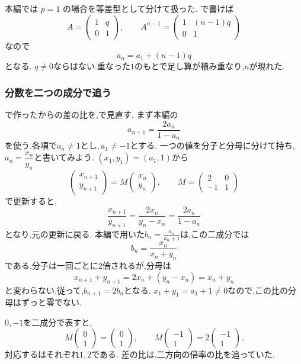 本編では $p=1$ の場合を等差型として分けて扱った.
で書けば
\[
  A=\begin{pmatrix}1&q\\0&1\end{pmatrix},
  \qquad
  A^{n-1}=\begin{pmatrix}1&(n-1)q\\0&1\end{pmatrix}
\]
なので
\[
  a_n=a_1+(n-1)q
\]
となる.
$q\ne0$ならはない.重なった$1$のもとで足し算が積み重なり,$n$が現れた.



\subsubsection{分数を二つの成分で追う}\label{節：一次分数型を行列で見直す}

で作ったからの差の比を,で見直す.
まず本編の
\[
  a_{n+1}=\frac{2a_n}{1-a_n}
\]
を使う.各項で$a_n\ne1$とし,\,$a_1\ne-1$とする.
一つの値を分子と分母に分けて持ち,$a_n=\dfrac{x_n}{y_n}$と書いてみよう.
$(x_1,y_1)=(a_1,1)$から
\[
  \begin{pmatrix}x_{n+1}\\y_{n+1}\end{pmatrix}
  =M\begin{pmatrix}x_n\\y_n\end{pmatrix},
  \qquad
  M=\begin{pmatrix}2&0\\-1&1\end{pmatrix}
\]
で更新すると,
\[
  \frac{x_{n+1}}{y_{n+1}}
  =\frac{2x_n}{y_n-x_n}
  =\frac{2a_n}{1-a_n}
\]
となり,元の更新に戻る.
本編で用いた$\displaystyle b_n=\frac{a_n}{a_n+1}$は,この二成分では
\[
  b_n=\frac{x_n}{x_n+y_n}
\]
である.分子は一回ごとに$2$倍されるが,分母は
\[
  x_{n+1}+y_{n+1}=2x_n+(y_n-x_n)=x_n+y_n
\]
と変わらない.従って,$b_{n+1}=2b_n$となる.
$x_1+y_1=a_1+1\ne0$なので,この比の分母はずっと零でない.

$0,-1$を二成分で表すと,
\[
  M\begin{pmatrix}0\\1\end{pmatrix}
  =\begin{pmatrix}0\\1\end{pmatrix},
  \qquad
  M\begin{pmatrix}-1\\1\end{pmatrix}
  =2\begin{pmatrix}-1\\1\end{pmatrix}.
\]
対応するはそれぞれ$1,2$である.
差の比は,二方向の倍率の比を追っていた.

